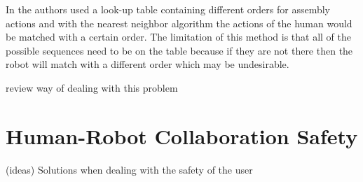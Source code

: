In \cite{Maeda2016} the authors used a look-up table containing different orders for assembly actions and with the nearest neighbor algorithm the actions of the human would be matched with a certain order. The limitation of this method is that all of the possible sequences need to be on the table because if they are not there then the robot will match with a different order which may be undesirable.

{\color{gray}
review \cite{Canuto2021} way of dealing with this problem
}

\section{Human-Robot Collaboration Safety}

{\color{gray}
(ideas) Solutions when dealing with the safety of the user
}